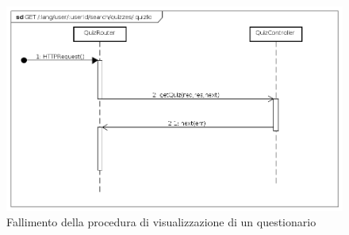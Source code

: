 \begin{itemize}
\begin{figure}[ht]
	\centering
	\includegraphics[scale=0.45]{UML/DiagrammiDiSequenza/Back-end/GET__lang_user__userId_search_quizzes__quizId_failure.png}
	\caption{Fallimento della procedura di visualizzazione di un questionario}
\end{figure}
\FloatBarrier

\end{itemize}
